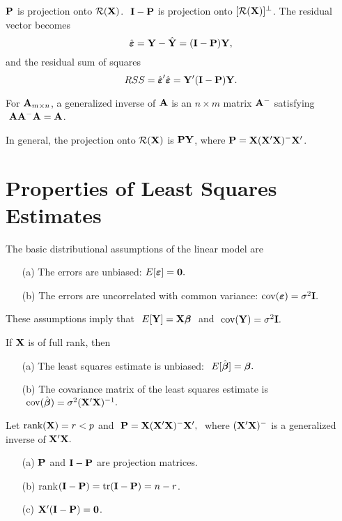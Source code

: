 \documentclass[11pt]{article}
\newcommand{\bdefi}{\vb\begin{defi}}
\newcommand{\edefi}{\end{defi}\vb}
\newcommand{\btheo}{\vb\begin{theo}}
\newcommand{\etheo}{\end{theo}\vb}
\newcommand{\bstheo}{\begin{theo}}
\newcommand{\estheo}{\end{theo}}
\newcommand{\bnote}{\vb\begin{note}}
\newcommand{\enote}{\end{note}\vb}
\newcommand{\bsnote}{\begin{note}}
\begin{document}
\bsnote
$\mathbf{P}$ is projection onto $\cal{R}(\mathbf{X})$.  $\ \bfI-\bfP$ is
projection onto $[\cal{R}(\mathbf{X})]^\perp$.  The residual vector becomes
$$\hat{\mbox{\boldmath $\varepsilon$}}=\mathbf{Y}-\hat{\mathbf{Y}}=(\mathbf{I}-\mathbf{P})\mathbf{Y},$$ 
and the residual sum of squares
$$RSS=\hat{\mbox{\boldmath $\varepsilon$}}'\hat{\mbox{\boldmath $\varepsilon$}}=\mathbf{Y}'(\mathbf{I}-\mathbf{P})\mathbf{Y}.$$
\enote

\bdefi
For $\mathbf{A}_{m \times n}$, a generalized inverse of $\mathbf{A}$ is an $n
\times m$ matrix $\mathbf{A}^{-}$ satisfying $\ \mathbf{A}\mathbf{A}^{-}\mathbf{A} = \mathbf{A}$.
\edefi

\bstheo
In general, the projection onto $\cal{R}(\mathbf{X})$ is $\mathbf{P}\mathbf{Y}$, where
$\mathbf{P} = \mathbf{X}(\mathbf{X}'\mathbf{X})^{-}\mathbf{X}'$.
\etheo



\newpage
	
\section{Properties of Least Squares Estimates}

\vb

\bnote
The basic distributional assumptions of the linear model are
\begin{itemize}
\item[(a)] 
The errors are unbiased: $ E[\mbox{\boldmath $\varepsilon$}]=\mathbf{0}.$
\item[(b)] 
The errors are uncorrelated with common variance: $
\mathrm{cov}(\mbox{\boldmath $\varepsilon$})=\sigma^2\mathbf{I}.$
\end{itemize}
These assumptions imply that $\ E[\mathbf{Y}] = \mathbf{X}\mbox{\boldmath $\beta$}\ $ and $\
\mathrm{cov}(\mathbf{Y}) = \sigma^2\mathbf{I}.$
\enote

\btheo
If $\mathbf{X}$ is of full rank, then
\begin{itemize}
\item[(a)]
The least squares estimate is unbiased: $\ E[\hat{\mbox{\boldmath $\beta$}}] = \mbox{\boldmath $\beta$}.$
\item[(b)]
The covariance matrix of the least squares estimate is $\
\mathrm{cov}(\hat{\mbox{\boldmath $\beta$}}) = \sigma^2 (\mathbf{X}'\mathbf{X})^{-1}.$
\end{itemize}
\estheo

\btheo
\label{theo.ls2}
Let $\mbox{rank}(\mathbf{X})=r<p$ and $\ \mathbf{P}=\mathbf{X}(\mathbf{X}'\mathbf{X})^-\mathbf{X}',\ $
where $(\mathbf{X}'\mathbf{X})^-$ is a generalized inverse of $\mathbf{X}'\mathbf{X}.$ 
\begin{itemize}
\item[(a)]
$\mathbf{P}$ and $\mathbf{I}-\mathbf{P}$ are projection matrices.
\item[(b)]
rank$(\mathbf{I}-\mathbf{P})=\mathrm{tr}(\mathbf{I}-\mathbf{P})=n-r$.
\item[(c)]
$\mathbf{X}'(\mathbf{I}-\mathbf{P})=\mathbf{0}$.
\end{itemize}
\etheo
\end{document}

